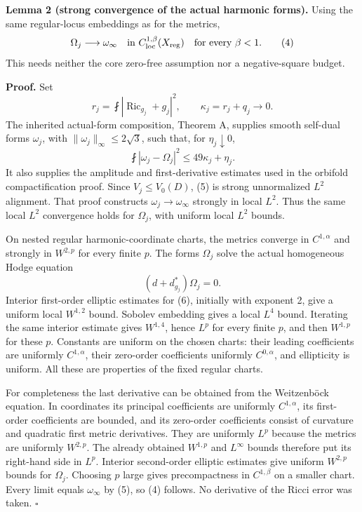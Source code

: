 \documentclass[
  11pt,
]{article}
\begin{document}
\textbf{Lemma 2 (strong convergence of the actual harmonic forms).}
Using the same regular-locus embeddings as for the metrics, \[
             \Omega_j\longrightarrow\omega_\infty
                    \quad\hbox{in }C^{1,\beta}_{\mathrm{loc}}(X_{\rm reg})
 \quad\text{for every }\beta<1.                       \tag{4}
\] This needs neither the core zero-free assumption nor a
negative-square budget.

\textbf{Proof.} Set \[
 r_j=\fint|\operatorname{Ric}_{g_j}+g_j|^2,
 \qquad \kappa_j=r_j+q_j\longrightarrow0.
\] The inherited actual-form composition, Theorem A, supplies smooth
self-dual forms \(\omega_j\), with \(\|\omega_j\|_\infty\le2\sqrt3\),
such that, for \(\eta_j\downarrow0\), \[
                \fint|\omega_j-\Omega_j|^2
                          \le49\kappa_j+\eta_j.        \tag{5}
\] It also supplies the amplitude and first-derivative estimates used in
the orbifold compactification proof. Since \(V_j\le V_0(D)\), (5) is
strong unnormalized \(L^2\) alignment. That proof constructs
\(\omega_j\to\omega_\infty\) strongly in local \(L^2\). Thus the same
local \(L^2\) convergence holds for \(\Omega_j\), with uniform local
\(L^2\) bounds.

On nested regular harmonic-coordinate charts, the metrics converge in
\(C^{1,\alpha}\) and strongly in \(W^{2,p}\) for every finite \(p\). The
forms \(\Omega_j\) solve the actual homogeneous Hodge equation \[
                  (d+d_{g_j}^*)\Omega_j=0.             \tag{6}
\] Interior first-order elliptic estimates for (6), initially with
exponent 2, give a uniform local \(W^{1,2}\) bound. Sobolev embedding
gives a local \(L^4\) bound. Iterating the same interior estimate gives
\(W^{1,4}\), hence \(L^p\) for every finite \(p\), and then \(W^{1,p}\)
for these \(p\). Constants are uniform on the chosen charts: their
leading coefficients are uniformly \(C^{1,\alpha}\), their zero-order
coefficients uniformly \(C^{0,\alpha}\), and ellipticity is uniform. All
these are properties of the fixed regular charts.

For completeness the last derivative can be obtained from the
Weitzenböck equation. In coordinates its principal coefficients are
uniformly \(C^{1,\alpha}\), its first-order coefficients are bounded,
and its zero-order coefficients consist of curvature and quadratic first
metric derivatives. They are uniformly \(L^p\) because the metrics are
uniformly \(W^{2,p}\). The already obtained \(W^{1,p}\) and \(L^\infty\)
bounds therefore put its right-hand side in \(L^p\). Interior
second-order elliptic estimates give uniform \(W^{2,p}\) bounds for
\(\Omega_j\). Choosing \(p\) large gives precompactness in
\(C^{1,\beta}\) on a smaller chart. Every limit equals \(\omega_\infty\)
by (5), so (4) follows. No derivative of the Ricci error was taken.
\(\square\)
\end{document}
